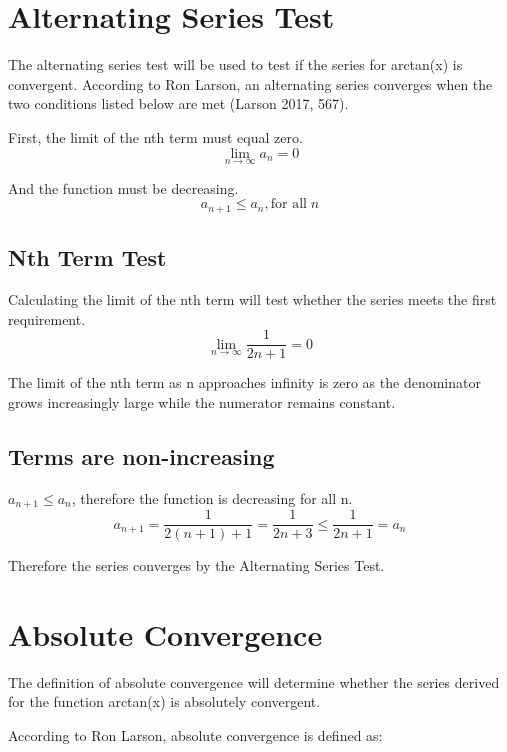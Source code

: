 \documentclass[12pt, titlepage]{article}
\begin{document}
\section{Alternating Series Test}
The alternating series test will be used to test if the series for arctan(x) is convergent. According to Ron Larson, an alternating series converges when the two conditions listed below are met (Larson 2017, 567).

First, the limit of the nth term must equal zero.
\begin{equation*}
    \lim_{n \to \infty} a_{n} = 0
\end{equation*}

And the function must be decreasing.
\begin{equation*}
    a_{n+1} \leq a_{n}, \textrm{for all} \; n
\end{equation*}

\subsection{Nth Term Test}
Calculating the limit of the nth term will test whether the series meets the first requirement.
\begin{equation*}
    \lim_{n \to \infty} \frac{1}{2n+1} = 0     
\end{equation*}

The limit of the nth term as n approaches infinity is zero as the denominator grows increasingly large while the numerator remains constant.

\subsection{Terms are non-increasing}
\(a_{n+1} \leq a_{n}\), therefore the function is decreasing for all n. 
\begin{equation*}
    a_{n+1} = \frac{1}{2(n+1) + 1} = \frac{1}{2n+3} \leq \frac{1}{2n+1} = a_{n}
\end{equation*}

Therefore the series converges by the Alternating Series Test.

\section{Absolute Convergence}
The definition of absolute convergence will determine whether the series derived for the function arctan(x) is absolutely convergent.

According to Ron Larson, absolute convergence is defined as: 
\end{document}
